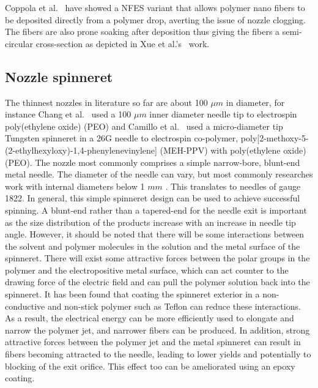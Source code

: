 \documentclass[5p,,preprint,12pt,twocolumn]{elsarticle}
\begin{document}
Coppola et al.\unskip~\cite{527120:11974307} have showed a NFES variant that allows polymer nano fibers to be deposited directly from a polymer drop, averting the issue of nozzle clogging. The fibers are also prone soaking after deposition thus giving the fibers a semi-circular cross-section as depicted in Xue et al.'s\unskip~\cite{527120:11974326} work. 



\subsection{Nozzle spinneret}The thinnest nozzles in literature so far are about 100 $\mu m $ in diameter, for instance Chang et al.\unskip~\cite{527120:11974306} used a 100 $\mu m $ inner diameter needle tip to electrospin poly(ethylene oxide) (PEO) and Camillo et al.\unskip~\cite{527120:12322072} used a micro-diameter tip Tungsten spinneret in a 26G needle to electrospin co-polymer, poly[2-methoxy-5-(2-ethylhexyloxy)-1,4-phenylenevinylene] (MEH-PPV) with poly(ethylene oxide) (PEO). The nozzle most commonly comprises a simple narrow-bore, blunt-end metal needle. The diameter of the needle can vary, but most commonly researches work with internal diameters below 1 $mm $ . This translates to needles of gauge 18{\textendash}22. In general, this simple spinneret design can be used to achieve successful spinning. A blunt-end rather than a tapered-end for the needle exit is important as the size distribution of the products increase with an increase in needle tip angle. However, it should be noted that there will be some interactions between the solvent and polymer molecules in the solution and the metal surface of the spinneret. There will exist some attractive forces between the polar groups in the polymer and the electropositive metal surface, which can act counter to the drawing force of the electric field and can pull the polymer solution back into the spinneret. It has been found that coating the spinneret exterior in a non-conductive and non-stick polymer such as Teflon can reduce these interactions.\unskip~\cite{527120:13082768} As a result, the electrical energy can be more efficiently used to elongate and narrow the polymer jet, and narrower fibers can be produced. In addition, strong attractive forces between the polymer jet and the metal spinneret can result in fibers becoming attracted to the needle, leading to lower yields and potentially to blocking of the exit orifice. This effect too can be ameliorated using an epoxy coating.\unskip~\cite{527120:13082811}
\end{document}
